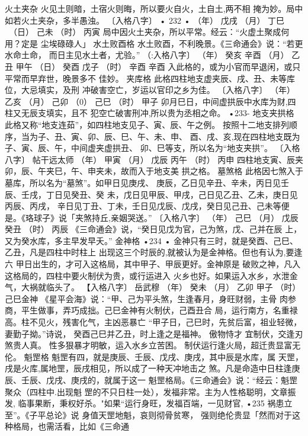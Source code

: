 火土夹杂
火见土则暗，土宿火则晦，所以要火自火，土自土,两不相
掩为妙。局中如若火土夹杂，多半愚浊。
〔入格八字〕
• 232 •
（年） 戊戌
（月） 丁巳
~（日） 己未
（时） 丙寅
局中因火土夹杂，所以平常。经云：“火虚土聚成何用？定是
尘埃碌碌人」
水土败酉格
水土败酉，不利晚景。《三命通会》说：“若更水命土命，
而日主见水土者，尤验。”
（:入格八字〕
（年） 癸亥 辛酉
（月） 乙丑 甲午
（日） 癸酉 戊子
（时） 辛酉 辛酉
入此格的，或为小官而早退闲，或只平常而早弃世，晚景多不
佳妙。
夹库格
此格四柱地支虚夹辰、戌、丑、未等库位，大忌填实，及刑
冲破害空亡，岁运以官印之乡为佳。
〔入格八字〕
（年） 乙亥
（月） 己卯
（0） 己巳
（时） 甲子
卯月巳日，中间虚拱辰中水库为财,四柱又无辰支填实，且不
犯空亡破害刑冲,所以贵为丞相之命。
•233-
地支夹拱格
此格又称“地支连茹”，如四柱地支见子、寅、辰、午之例。
按照十二地支排列顺序，当为子、丑、寅、卯、辰、巳、午、未、申、
酉、戌、亥,现在四柱地支既为子、寅、辰、午，中间虚夹虚拱丑、
卯、巳等支，所以名为“地支夹拱”。
〔入格八字〕 帖干远太师
（年） 甲寅
（月） 戊辰
丙午
（时） 丙申
四柱地支寅、辰夹卯，辰、午夹巳，午、申夹未，故而入于地支美
拱之格。
墓煞格
此格因七煞入于墓库，所以名为“墓煞”。如甲日见庚戌、
庚辰，乙日见辛丑、辛未，丙日见壬辰、壬戌，丁日见癸丑、癸
未，戊日见甲辰、甲戌，己日见乙丑、乙未，庚日见丙辰、丙戌，
辛日见丁丑、丁未，壬日见戊辰、戊戌，癸日见己丑、己未等便
是。《珞球子》说「夹煞持丘,亲姻哭送。”
〔入格八字〕
（年） 己巳
（月） 戊辰
癸丑
（时） 丙辰
《三命通会》说，“癸日见戊为官，己为煞，戊、己并在辰
上，又为癸水库，多主早发早夭。”
金神格
•234 •
金神只有三时，就是癸酉、己巳、乙丑，凡是四柱中时柱上
出现这三个时辰的,就被认为是金神格。但也有认为,要逢六
甲日出生的，才可入这格局，其中甲子、甲辰更好。金神原是
破败之神，凡入这格局的，四柱中要火制伏为贵，或行运进入
火乡也好。如果运入水乡，水泄金气，大祸就临头了。
【入格八字〕 岳武穆
（年） 癸未
（月） 乙卯
甲子
（时） 己巳金神
《星平会海》说：“甲、己为平头煞，生逢春月，身旺财弱，主骨
肉参商，平生做事，弄巧成拙。己巳金神有火制伏，己酉丑合
局，运行南方，名重禄高。柱不见火，残害化气，主凶恶暴亡
“甲子日，己巳时，先贫后富，祖业轻微，妻勤子拗。”诗说，
癸酉己巳并乙丑，时上逢之是福神。
傲物恃才 宜制伏，交逢刃煞贵人真。
性多狠暴才明敏，运入水乡立苦困。
制伏运行逢火局，超迁贵显富无伦。
魁罡格
魁罡有四，就是庚辰、壬辰、戊戌、庚戌，其中辰是水库，属
天罡，戌是火库,属地罡，辰戌相见，所以成了一种天冲地击之
煞。凡是命造中日柱逢庚辰、壬辰、戊戌、庚戌的，就属于这一
魁罡格局。《三命通会》说：“经云：魁罡聚众（四柱中.出现魁
罡的不只日柱一处），发福非常。主为人性格聪明，文章振发,
临事果断，秉权好杀。"如果“运行身旺，发福百端，一见财官,
•235
祸患立至”。《子平总论》说 身值天罡地魁，哀则彻骨贫寒，
强则绝伦贵显「然而对于这种格局，也需活看，比如《三命通
